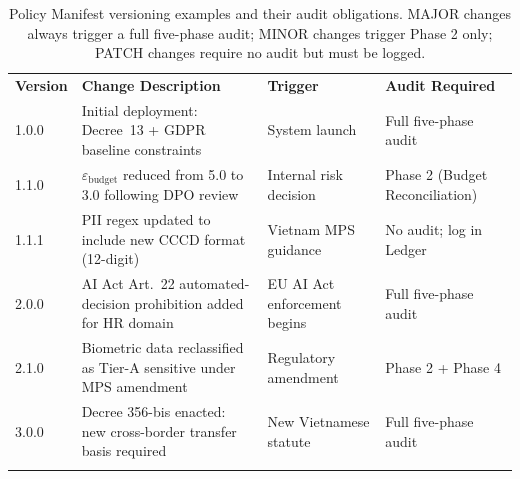 \begin{table}[ht]
\centering
\caption{Policy Manifest versioning examples and their audit obligations. MAJOR changes always trigger a full five-phase audit; MINOR changes trigger Phase 2 only; PATCH changes require no audit but must be logged.}
\label{tab:policy_versioning}
\renewcommand{\arraystretch}{1.3}
\begin{tabular}{p{1.6cm} p{4.5cm} p{3.5cm} p{2.5cm}}
\hline\noalign{\smallskip}
\textbf{Version} & \textbf{Change Description} & \textbf{Trigger} & \textbf{Audit Required} \\
\noalign{\smallskip}\svhline\noalign{\smallskip}
1.0.0 & Initial deployment: Decree~13 + GDPR baseline constraints & System launch & Full five-phase audit \\[3pt]
1.1.0 & $\varepsilon_{\text{budget}}$ reduced from 5.0 to 3.0 following DPO review & Internal risk decision & Phase 2 (Budget Reconciliation) \\[3pt]
1.1.1 & PII regex updated to include new CCCD format (12-digit) & Vietnam MPS guidance & No audit; log in Ledger \\[3pt]
2.0.0 & AI Act Art.~22 automated-decision prohibition added for HR domain & EU AI Act enforcement begins & Full five-phase audit \\[3pt]
2.1.0 & Biometric data reclassified as Tier-A sensitive under MPS amendment & Regulatory amendment & Phase 2 + Phase 4 \\[3pt]
3.0.0 & Decree 356-bis enacted: new cross-border transfer basis required & New Vietnamese statute & Full five-phase audit \\
\noalign{\smallskip}\hline\noalign{\smallskip}
\end{tabular}
\end{table}

